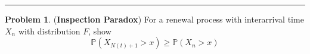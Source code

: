 \documentclass[a4paper, 10pt]{article}
\theoremstyle{definition}
\newtheorem{problem}{Problem}
\theoremstyle{hSol}
\begin{document}
\noindent\rule{16cm}{0.4pt}
\begin{problem} (\textbf{Inspection Paradox}) For a renewal process with interarrival time $X_n$ with distribution $F$, show
$$\mathbb{P}\left(X_{N(t)+1}>x\right)\geq \mathbb{P}\left(X_n>x\right)$$
\end{problem}
\end{document}
